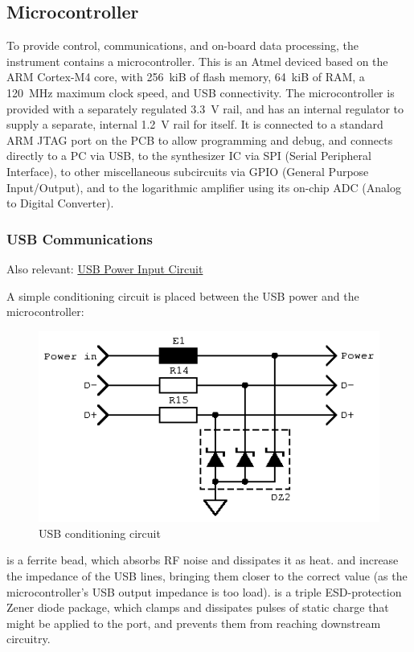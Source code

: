 \subsection{Microcontroller}

To provide control, communications, and on-board data processing, the
instrument contains a microcontroller. This is an Atmel deviced based
on the ARM Cortex-M4 core, with 256~kiB of flash memory, 64~kiB of RAM,
a 120~MHz maximum clock speed, and USB connectivity. The microcontroller
is provided with a separately regulated 3.3~V rail, and has an internal
regulator to supply a separate, internal 1.2~V rail for itself. It is
connected to a standard ARM JTAG port on the PCB to allow programming and
debug, and connects directly to a PC via USB, to the synthesizer IC via
SPI (Serial Peripheral Interface), to other miscellaneous subcircuits via
GPIO (General Purpose Input/Output), and to the logarithmic amplifier using
its on-chip ADC (Analog to Digital Converter).

\subsubsection{USB Communications}
\begin{framed}
Also relevant: \hyperref[ssc:usbpower]{USB Power Input Circuit}
\end{framed}

A simple conditioning circuit is placed between the USB power and
the microcontroller:

\begin{figure}[H]
\centering
\includegraphics{too/usbprot}
\caption{USB conditioning circuit}
\label{fig:usbcond}
\end{figure}

 is a ferrite bead, which absorbs RF noise and dissipates it as heat.
 and  increase the impedance of the USB lines, bringing
them closer to the correct value (as the microcontroller's USB output impedance
is too load).  is a triple ESD-protection Zener diode package, which
clamps and dissipates pulses of static charge that might be applied to the port,
and prevents them from reaching downstream circuitry.
